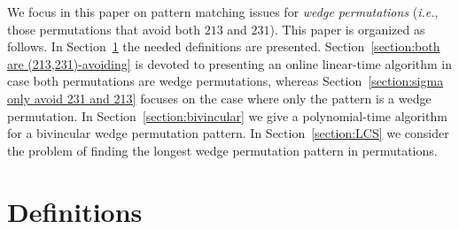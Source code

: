 \documentclass[a4paper]{llncs}
\newcounter{num}
\begin{document}
We focus in this paper on pattern matching issues for \emph{wedge permutations}
(\emph{i.e.}, those permutations that avoid both $213$ and $231$). 
This paper is organized as follows.
In Section~\ref{section:Definitions} the needed definitions are presented.
Section~\ref{section:both are (213,231)-avoiding} is devoted to presenting
an online linear-time algorithm in case both
permutations are wedge permutations,
whereas Section~\ref{section:sigma only avoid 231 and 213} focuses on the case
where only the pattern is a wedge permutation.
In Section~\ref{section:bivincular} we give a polynomial-time algorithm
for a bivincular wedge permutation pattern.
In Section~\ref{section:LCS} we consider the problem of finding the longest
wedge permutation pattern in permutations.



\section{Definitions}
\label{section:Definitions}
\end{document}
